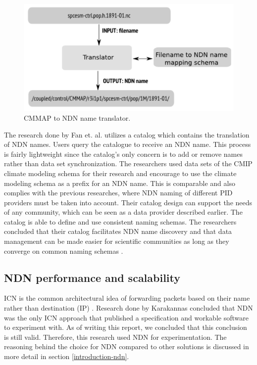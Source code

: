 \begin{figure}[H]
\centering
\includegraphics[scale=0.4]{Images/cmip2ndn.png}
\caption{CMMAP to NDN name translator.}
\label{fig:cmmap_ndnn}
\end{figure}

The research done by Fan et. al. utilizes a catalog which contains the translation of NDN names. Users query the catalogue to receive an NDN name. This process is fairly lightweight since the catalog's only concern is to add or remove names rather than data set synchronization. The researchers used data sets of the CMIP climate modeling schema for their research and encourage to use the climate modeling schema as a prefix for an NDN name. This is comparable and also complies with the previous researches, where NDN naming of different PID providers must be taken into account.
Their catalog design can support the needs of any community, which can be seen as a data provider described earlier. The catalog is able to define and use consistent naming schemas.
The researchers concluded that their catalog facilitates NDN name discovery and that data management can be made easier for scientific communities as long as they converge on common naming schemas \cite{ndn-man}. 

\subsection{NDN performance and scalability}
\label{introduction-related-work-ndn}
ICN is the common architectural idea of forwarding packets based on their name rather than destination (IP) \cite{jacobson2009networking}. Research done by Karakannas \cite{icn-bd} concluded that NDN was the only ICN approach that published a specification and workable software to experiment with. As of writing this report, we concluded that this conclusion is still valid. Therefore, this research used NDN for experimentation. The reasoning behind the choice for NDN compared to other solutions is discussed in more detail in section \ref{introduction-ndn}.


